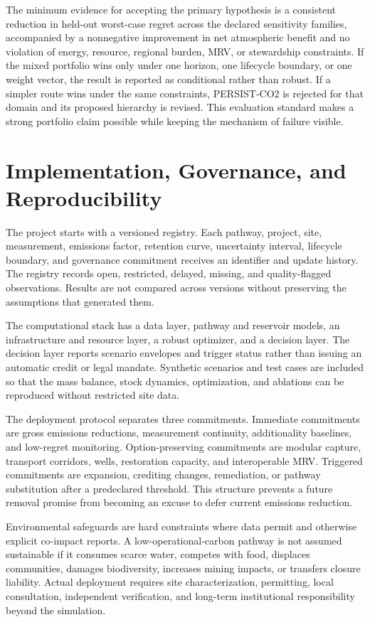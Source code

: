 \documentclass[conference]{IEEEtran}
\begin{document}
The minimum evidence for accepting the primary hypothesis is a consistent reduction in held-out worst-case regret across the declared sensitivity families, accompanied by a nonnegative improvement in net atmospheric benefit and no violation of energy, resource, regional burden, MRV, or stewardship constraints. If the mixed portfolio wins only under one horizon, one lifecycle boundary, or one weight vector, the result is reported as conditional rather than robust. If a simpler route wins under the same constraints, PERSIST-CO2 is rejected for that domain and its proposed hierarchy is revised. This evaluation standard makes a strong portfolio claim possible while keeping the mechanism of failure visible.

\section{Implementation, Governance, and Reproducibility}
The project starts with a versioned registry. Each pathway, project, site, measurement, emissions factor, retention curve, uncertainty interval, lifecycle boundary, and governance commitment receives an identifier and update history. The registry records open, restricted, delayed, missing, and quality-flagged observations. Results are not compared across versions without preserving the assumptions that generated them.

The computational stack has a data layer, pathway and reservoir models, an infrastructure and resource layer, a robust optimizer, and a decision layer. The decision layer reports scenario envelopes and trigger status rather than issuing an automatic credit or legal mandate. Synthetic scenarios and test cases are included so that the mass balance, stock dynamics, optimization, and ablations can be reproduced without restricted site data.

The deployment protocol separates three commitments. Immediate commitments are gross emissions reductions, measurement continuity, additionality baselines, and low-regret monitoring. Option-preserving commitments are modular capture, transport corridors, wells, restoration capacity, and interoperable MRV. Triggered commitments are expansion, crediting changes, remediation, or pathway substitution after a predeclared threshold. This structure prevents a future removal promise from becoming an excuse to defer current emissions reduction.

Environmental safeguards are hard constraints where data permit and otherwise explicit co-impact reports. A low-operational-carbon pathway is not assumed sustainable if it consumes scarce water, competes with food, displaces communities, damages biodiversity, increases mining impacts, or transfers closure liability. Actual deployment requires site characterization, permitting, local consultation, independent verification, and long-term institutional responsibility beyond the simulation.
\end{document}
